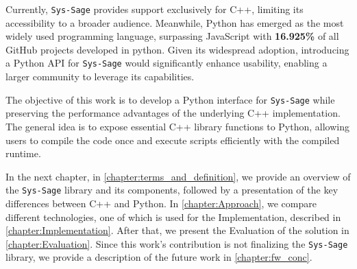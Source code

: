 Currently, \texttt{Sys-Sage} provides support exclusively for C++, limiting its accessibility to a broader audience. Meanwhile, Python has emerged as the most widely used programming language, surpassing JavaScript with \textbf{16.925\%} of all GitHub projects developed in python. Given its widespread adoption, introducing a Python \ac{API} for \texttt{Sys-Sage} would significantly enhance usability, enabling a larger community to leverage its capabilities. \cite{languages-github-stats}

The objective of this work is to develop a Python interface for \texttt{Sys-Sage} while preserving the performance advantages of the underlying C++ implementation. The general idea is to expose essential C++ library functions to Python, allowing users to compile the code once and execute scripts efficiently with the compiled runtime.

In the next chapter, in \autoref{chapter:terms_and_definition}, we provide an overview of the \texttt{Sys-Sage} library and its components, followed by a presentation of the key differences between C++ and Python.
In \autoref{chapter:Approach}, we compare different technologies, one of which is used for the Implementation, described in \autoref{chapter:Implementation}. After that, we present the Evaluation of the solution in \autoref{chapter:Evaluation}.
Since this work's contribution is not finalizing the \texttt{Sys-Sage} library, we provide a description of the future work in \autoref{chapter:fw_conc}.
